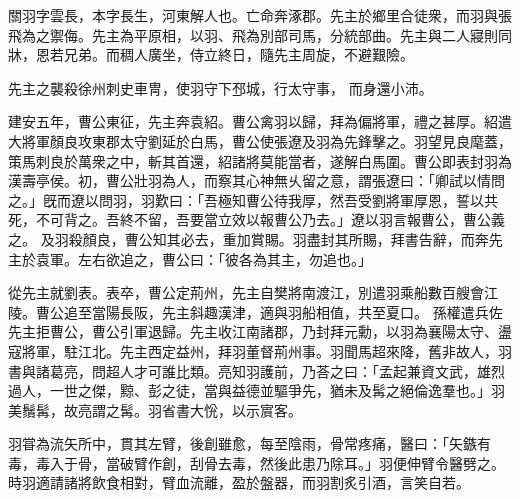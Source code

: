 \begin{pinyinscope}
 
 
 關羽字雲長，本字長生，河東解人也。亡命奔涿郡。先主於鄉里合徒衆，而羽與張飛為之禦侮。先主為平原相，以羽、飛為別部司馬，分統部曲。先主與二人寢則同牀，恩若兄弟。而稠人廣坐，侍立終日，隨先主周旋，不避艱險。
 
 
 先主之襲殺徐州刺史車冑，使羽守下邳城，行太守事，
 而身還小沛。
 
 
建安五年，曹公東征，先主奔袁紹。曹公禽羽以歸，拜為偏將軍，禮之甚厚。紹遣大將軍顏良攻東郡太守劉延於白馬，曹公使張遼及羽為先鋒擊之。羽望見良麾蓋，策馬刺良於萬衆之中，斬其首還，紹諸將莫能當者，遂解白馬圍。曹公即表封羽為漢壽亭侯。初，曹公壯羽為人，而察其心神無乆留之意，謂張遼曰：「卿試以情問之。」旣而遼以問羽，羽歎曰：「吾極知曹公待我厚，然吾受劉將軍厚恩，誓以共死，不可背之。吾終不留，吾要當立效以報曹公乃去。」遼以羽言報曹公，曹公義之。
 及羽殺顏良，曹公知其必去，重加賞賜。羽盡封其所賜，拜書告辭，而奔先主於袁軍。左右欲追之，曹公曰：「彼各為其主，勿追也。」
 
 
從先主就劉表。表卒，曹公定荊州，先主自樊將南渡江，別遣羽乘船數百艘會江陵。曹公追至當陽長阪，先主斜趣漢津，適與羽船相值，共至夏口。
 孫權遣兵佐先主拒曹公，曹公引軍退歸。先主收江南諸郡，乃封拜元勳，以羽為襄陽太守、盪寇將軍，駐江北。先主西定益州，拜羽董督荊州事。羽聞馬超來降，舊非故人，羽書與諸葛亮，問超人才可誰比類。亮知羽護前，乃荅之曰：「孟起兼資文武，雄烈過人，一世之傑，黥、彭之徒，當與益德並驅爭先，猶未及髯之絕倫逸羣也。」羽美鬚髯，故亮謂之髯。羽省書大恱，以示賔客。
 
 
 
 
 羽甞為流矢所中，貫其左臂，後創雖愈，每至陰雨，骨常疼痛，醫曰：「矢鏃有毒，毒入于骨，當破臂作創，刮骨去毒，然後此患乃除耳。」羽便伸臂令醫劈之。時羽適請諸將飲食相對，臂血流離，盈於盤器，而羽割炙引酒，言笑自若。
 

\end{pinyinscope}
